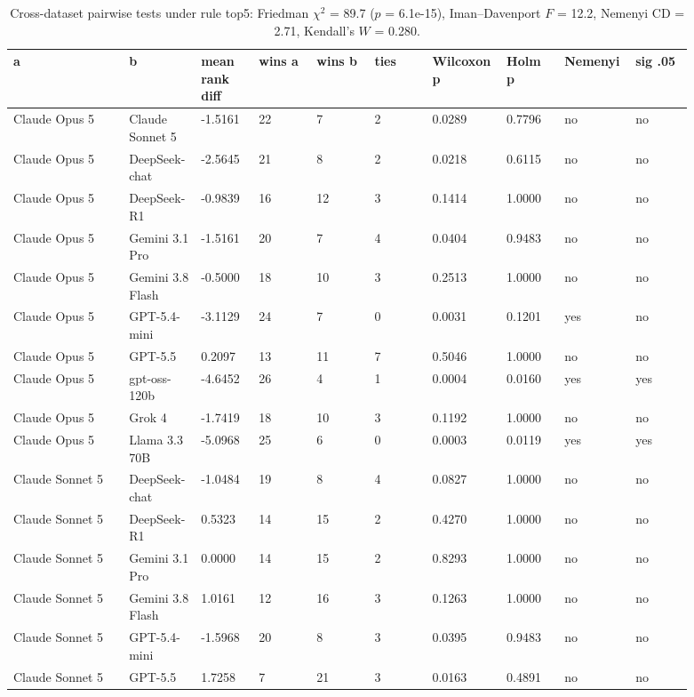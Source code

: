 \begin{landscape}
\tiny
\setlength{\tabcolsep}{3pt}
\begin{longtable}{p{0.162\linewidth}p{0.081\linewidth}p{0.081\linewidth}p{0.081\linewidth}p{0.081\linewidth}p{0.081\linewidth}p{0.081\linewidth}p{0.081\linewidth}p{0.081\linewidth}p{0.081\linewidth}}
\caption{Cross-dataset pairwise tests under rule top5: Friedman $\chi^2$ = 89.7 ($p$ = 6.1e-15), Iman--Davenport $F$ = 12.2, Nemenyi CD = 2.71, Kendall's $W$ = 0.280.}\label{tab:pairwise_top5}\\
\toprule
a & b & mean rank diff & wins a & wins b & ties & Wilcoxon p & Holm p & Nemenyi & sig .05 \\
\midrule
Claude Opus 5 & Claude Sonnet 5 & -1.5161 & 22 & 7 & 2 & 0.0289 & 0.7796 & no & no \\
Claude Opus 5 & DeepSeek-chat & -2.5645 & 21 & 8 & 2 & 0.0218 & 0.6115 & no & no \\
Claude Opus 5 & DeepSeek-R1 & -0.9839 & 16 & 12 & 3 & 0.1414 & 1.0000 & no & no \\
Claude Opus 5 & Gemini 3.1 Pro & -1.5161 & 20 & 7 & 4 & 0.0404 & 0.9483 & no & no \\
Claude Opus 5 & Gemini 3.8 Flash & -0.5000 & 18 & 10 & 3 & 0.2513 & 1.0000 & no & no \\
Claude Opus 5 & GPT-5.4-mini & -3.1129 & 24 & 7 & 0 & 0.0031 & 0.1201 & yes & no \\
Claude Opus 5 & GPT-5.5 & 0.2097 & 13 & 11 & 7 & 0.5046 & 1.0000 & no & no \\
Claude Opus 5 & gpt-oss-120b & -4.6452 & 26 & 4 & 1 & 0.0004 & 0.0160 & yes & yes \\
Claude Opus 5 & Grok 4 & -1.7419 & 18 & 10 & 3 & 0.1192 & 1.0000 & no & no \\
Claude Opus 5 & Llama 3.3 70B & -5.0968 & 25 & 6 & 0 & 0.0003 & 0.0119 & yes & yes \\
Claude Sonnet 5 & DeepSeek-chat & -1.0484 & 19 & 8 & 4 & 0.0827 & 1.0000 & no & no \\
Claude Sonnet 5 & DeepSeek-R1 & 0.5323 & 14 & 15 & 2 & 0.4270 & 1.0000 & no & no \\
Claude Sonnet 5 & Gemini 3.1 Pro & 0.0000 & 14 & 15 & 2 & 0.8293 & 1.0000 & no & no \\
Claude Sonnet 5 & Gemini 3.8 Flash & 1.0161 & 12 & 16 & 3 & 0.1263 & 1.0000 & no & no \\
Claude Sonnet 5 & GPT-5.4-mini & -1.5968 & 20 & 8 & 3 & 0.0395 & 0.9483 & no & no \\
Claude Sonnet 5 & GPT-5.5 & 1.7258 & 7 & 21 & 3 & 0.0163 & 0.4891 & no & no \\

\end{longtable}
\end{landscape}
